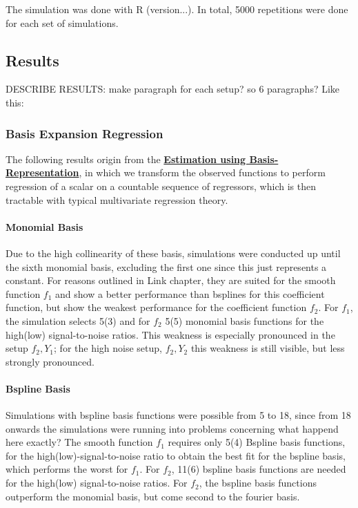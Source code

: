 \documentclass[11pt,twoside,a4paper]{article}
\begin{document}
	
		 The simulation was done with R (version...). In total, 5000 repetitions were done for each set of simulations. 
		
	
	\subsection{Results}
	{\color{green}DESCRIBE RESULTS: make paragraph for each setup? so 6 paragraphs? Like this: }
	
	
	\subsubsection{Basis Expansion Regression}
	The following results origin from the \hyperref[basis_exp_transf]{\textbf{Estimation using Basis-Representation}}, in which we transform the observed functions to perform regression of a scalar on a countable sequence of regressors, which is then tractable with typical multivariate regression theory. 
	
	\paragraph{Monomial Basis}
	Due to the high collinearity of these basis, simulations were conducted up until the sixth monomial basis, excluding the first one since this just represents a constant. For reasons outlined in {\color{green} Link chapter}, they are suited for the smooth function $f_1$ and show a better performance than bsplines for this coefficient function, but show the weakest performance for the coefficient function $f_2$. For $f_1$, the simulation selects 5(3) and for $f_2$ 5(5) monomial basis functions for the high(low) signal-to-noise ratios. This weakness is especially pronounced in the setup $f_2,Y_1$; for the high noise setup, $f_2, Y_2$ this weakness is still visible, but less strongly pronounced.
	
	\paragraph{Bspline Basis}
	Simulations with bspline basis functions were possible from 5 to 18, since from 18 onwards the simulations were running into problems concerning {\color{green} what happend here exactly?}
The smooth function $f_1$ requires only 5(4) Bspline basis functions, for the high(low)-signal-to-noise ratio to obtain the best fit for the bspline basis, which performs the worst for $f_1$. For $f_2$, 11(6) bspline basis functions are needed for the high(low) signal-to-noise ratios. For $f_2$, the bspline basis functions outperform the monomial basis, but come second to the fourier basis.
	
\end{document}
